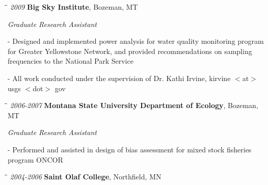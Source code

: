 \documentclass[9pt]{article}
\newenvironment{outerlist}[1][\enskip\textbullet]%
        {\begin{itemize}[#1]}{\end{itemize}%
         }
\newenvironment{innerlist}[1][\enskip\textbullet]%
        {\begin{compactitem}[#1]}{\end{compactitem}}
\begin{document}
\begin{tabbing}
\hspace*{.25cm}\=\hspace*{.25cm}\= \kill
\hspace{-1.5cm}\footnotesize{\textit{2009 }} \> \textbf{Big Sky Institute}, 
Bozeman, MT
\end{tabbing}

\begin{outerlist}

	\item[] \textit{Graduate Research Assistant}
		\begin{innerlist}
			\item[-] Designed and implemented power analysis for water quality monitoring program for Greater Yellowstone Network, and provided recommendations on sampling frequencies to the National Park Service
     \vspace{.05in}
      \item[-] All work conducted under the supervision of Dr. Kathi Irvine, kirvine $<$at$>$ usgs $<$dot$>$ gov
		\end{innerlist}
	\end{outerlist}


\begin{tabbing}
\hspace*{.25cm}\=\hspace*{.25cm}\= \kill
\hspace{-1.5cm}\footnotesize{\textit{2006-2007 }} \> \textbf{Montana State University Department of Ecology}, 
Bozeman, MT
\end{tabbing}
\begin{outerlist}
	\item[] \textit{Graduate Research Assistant} 
		\begin{innerlist}
			\item[-] Performed and assisted in design of bias assessment for mixed stock fisheries program ONCOR
		\end{innerlist}
	\end{outerlist}


\begin{tabbing}
\hspace*{.25cm}\=\hspace*{.25cm}\= \kill
\hspace{-1.5cm}\footnotesize{\textit{2004-2006 }} \> \textbf{Saint Olaf College}, 
Northfield, MN
\end{tabbing}
\end{document}
